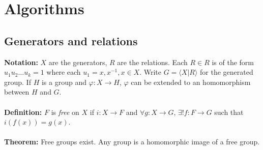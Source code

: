 \chapter{Algorithms}
\section {Generators and relations}
{\bf Notation:} $X$ are the generators, $R$ are the relations.  Each $R \in R$ is
of the form $u_1 u_2 \ldots u_k =1$ where each $u_1= x, x^{-1}, x \in X$.  Write
$G= \langle X|R \rangle $ for the generated group.  
If $H$ is a group and $\varphi: X \rightarrow H$,
$\varphi$ can be extended to an homomorphism between $H$ and $G$.
\\
\\
{\bf Definition:} $F$ is \emph{free} on $X$ if $i: X \rightarrow F$ and
$\forall g: X \rightarrow G$, $\exists ! f:F \rightarrow G$ such that
$i(f(x))=g(x)$.
\\
\\
{\bf Theorem:} Free groups exist.  Any group is a homomorphic image of a free group.
